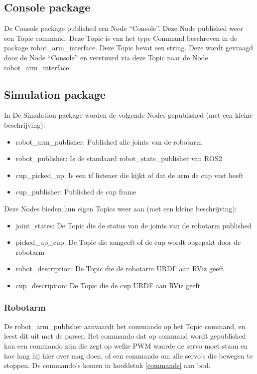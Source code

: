 \documentclass[12pt, legalpaper]{article}
\begin{document}
    \subsection{Console package}
    De Console package published een Node ``Console''.
    Deze Node published weer een Topic command. Deze Topic is van het type Command beschreven in de package robot\_arm\_interface.
    Deze Topic bevat een string. Deze wordt gevraagd door de Node ``Console'' en verstuurd via deze Topic naar de Node robot\_arm\_interface.

    \subsection{Simulation package}
    In De Simulation package worden de volgende Nodes gepublished (met een kleine beschrijving):
    \begin{itemize}
        \item robot\_arm\_publisher: Published alle joints van de robotarm
        \item robot\_publisher: Is de standaard robot\_state\_publisher van ROS2
        \item cup\_picked\_up: Is een tf listener die kijkt of dat de arm de cup vast heeft
        \item cup\_publisher: Published de cup frame
    \end{itemize}
    Deze Nodes bieden hun eigen Topics weer aan (met een kleine beschrijving):
    \begin{itemize}
        \item joint\_states: De Topic die de status van de joints van de robotarm published
        \item picked\_up\_cup: De Topic die aangeeft of de cup wordt opgepakt door de robotarm
        \item robot\_description: De Topic die de robotarm URDF aan RViz geeft
        \item cup\_description: De Topic die de cup URDF aan RViz geeft
    \end{itemize}

    \subsubsection{Robotarm}
    De robot\_arm\_publisher aanvaardt het commando op het Topic command, en leest dit uit met de parser.
    Het commando dat op command wordt gepublished kan een commando zijn die zegt op welke PWM waarde de servo moet staan en hoe lang hij hier over mag doen, of een commando om alle servo's die bewegen te stoppen.
    De commando's komen in hoofdstuk \ref{commands} aan bod.
\end{document}
